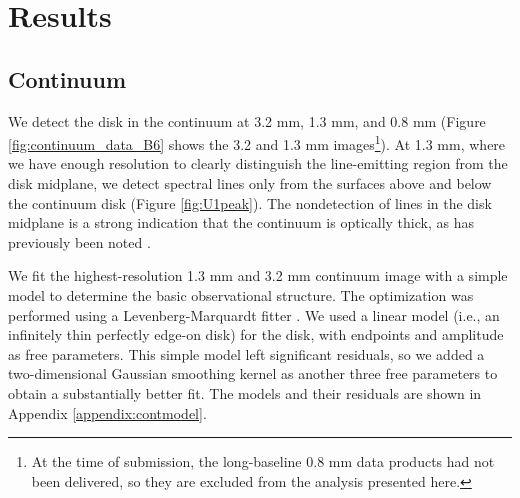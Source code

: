 \documentclass[twocolumn]{aastex61}
\def\ee#1{\ensuremath{\times10^{#1}}}
\newcommand{\perbeam}{\ensuremath{\textrm{beam}^{-1}}\xspace}
\def\FigureTwo#1#2#3#4#5#6{
\begin{figure}[!htp]
\subfigure[]{ \texttt{[image: \#1]} }
\subfigure[]{ \texttt{[image: \#2]} }
\caption{#3}
\label{#4}
\end{figure}
}
\begin{document}
\section{Results}
\label{sec:results}

\subsection{Continuum}
We detect the disk in the continuum at 3.2 mm, 1.3 mm, and 0.8 mm (Figure
\ref{fig:continuum_data_B6} shows the 3.2 and 1.3 mm images\footnote{At the
time of submission, the long-baseline 0.8 mm data products had not been
delivered, so they are excluded from the analysis presented here.}).  At 1.3
mm, where we have enough resolution to clearly distinguish the line-emitting
region from the disk midplane, we detect spectral lines only from the surfaces
above and below the continuum disk (Figure \ref{fig:U1peak}).  The nondetection
of lines in the disk midplane is a strong indication that the continuum is
optically thick, as has previously been noted \citep[e.g.,][]{Plambeck2016a}.


We fit the highest-resolution 1.3 mm and 3.2 mm continuum image with a simple
model to determine the basic
observational structure.
The optimization was performed using a Levenberg-Marquardt
fitter \citep{Newville2014a}. 
We used a linear model (i.e., an infinitely thin
perfectly edge-on disk) for the disk, with endpoints and amplitude as free parameters.
This simple model left significant residuals, so we added a two-dimensional
Gaussian smoothing kernel as another three free parameters to obtain a
substantially better fit.
The models and their residuals
are shown in Appendix \ref{appendix:contmodel}.
\end{document}
